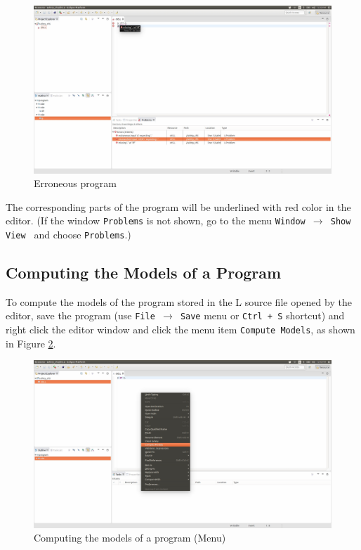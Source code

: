 \documentclass[a4paper,10pt]{article}
\begin{document}
\begin{figure}[H]
\centering
\includegraphics[width=1.0\textwidth]{9}
\caption{Erroneous program}\label{fig9}
\end{figure}


\noindent
The corresponding parts of the program will be underlined with red color in the editor. (If the window \texttt{Problems} is not shown, go to the menu \texttt{Window $\to$ Show View } and choose \texttt{Problems}.)
 
\subsection{Computing the Models of a Program}

To compute the models of the program stored in the L source file opened by the editor,
save the program (use \texttt{File $\to$ Save} menu or \texttt{Ctrl + S} shortcut) and  right click the editor window and click  the menu item \texttt{Compute Models}, as shown in Figure \ref{fig10}.


\begin{figure}[H]
\centering
\includegraphics[width=1.0\textwidth]{10}
\caption{Computing the models of a program (Menu)}\label{fig10}
\end{figure}
\end{document}
